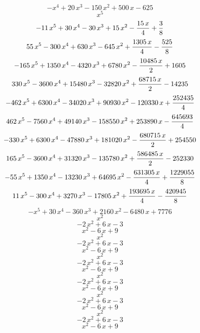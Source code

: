 $$-x^4+20\,x^3-150\,x^2+500\,x-625$$
$$x^5$$
$$-11\,x^5+30\,x^4-30\,x^3+15\,x^2-{{15\,x}\over{4}}+{{3}\over{8}}$$
$$55\,x^5-300\,x^4+630\,x^3-645\,x^2+{{1305\,x}\over{4}}-{{525}\over{
 8}}$$
$$-165\,x^5+1350\,x^4-4320\,x^3+6780\,x^2-{{10485\,x}\over{2}}+1605$$
$$330\,x^5-3600\,x^4+15480\,x^3-32820\,x^2+{{68715\,x}\over{2}}-14235$$
$$-462\,x^5+6300\,x^4-34020\,x^3+90930\,x^2-120330\,x+{{252435}\over{
 4}}$$
$$462\,x^5-7560\,x^4+49140\,x^3-158550\,x^2+253890\,x-{{645693}\over{
 4}}$$
$$-330\,x^5+6300\,x^4-47880\,x^3+181020\,x^2-{{680715\,x}\over{2}}+
 254550$$
$$165\,x^5-3600\,x^4+31320\,x^3-135780\,x^2+{{586485\,x}\over{2}}-
 252330$$
$$-55\,x^5+1350\,x^4-13230\,x^3+64695\,x^2-{{631305\,x}\over{4}}+{{
 1229055}\over{8}}$$
$$11\,x^5-300\,x^4+3270\,x^3-17805\,x^2+{{193695\,x}\over{4}}-{{
 420945}\over{8}}$$
$$-x^5+30\,x^4-360\,x^3+2160\,x^2-6480\,x+7776$$
$$x^2$$
$$-2\,x^2+6\,x-3$$
$$x^2-6\,x+9$$
$$x^2$$
$$-2\,x^2+6\,x-3$$
$$x^2-6\,x+9$$
$$x^2$$
$$-2\,x^2+6\,x-3$$
$$x^2-6\,x+9$$
$$x^2$$
$$-2\,x^2+6\,x-3$$
$$x^2-6\,x+9$$
$$x^2$$
$$-2\,x^2+6\,x-3$$
$$x^2-6\,x+9$$
$$x^2$$
$$-2\,x^2+6\,x-3$$
$$x^2-6\,x+9$$
